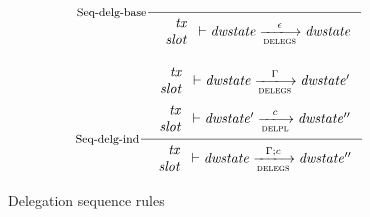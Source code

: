 \begin{figure}
  \begin{equation}
    \inference[Seq-delg-base]
    {}
    {
      \begin{array}{r}
        \var{tx}\\
        \var{slot}
      \end{array}
      \vdash
      \var{dwstate}
      \trans{delegs}{\epsilon}
      \var{dwstate}
    }
    \label{eq:rule:sequence-delegation-base}
  \end{equation}

  \begin{equation}
    \inference[Seq-delg-ind]
    {
      {
        \begin{array}{r}
          \var{tx}\\
          \var{slot}\\
        \end{array}
      }
      \vdash
      \var{dwstate}
      \trans{delegs}{\Gamma}
      \var{dwstate'}
    \\ ~ \\
    {
      \begin{array}{r}
        \var{tx}\\
        \var{slot}\\
      \end{array}
    }
    \vdash
      \var{dwstate'}
      \trans{delpl}{c}
      \var{dwstate''}
    }
    {
    {
      \begin{array}{r}
        \var{tx}\\
        \var{slot}\\
      \end{array}
    }
    \vdash
      \var{dwstate}
      \trans{delegs}{\Gamma; c}
      \var{dwstate''}
    }
    \label{eq:rule:sequence-delegation-inductive}
  \end{equation}
  \caption{Delegation sequence rules}
  \label{fig:rules:delegation-sequence}
\end{figure}

